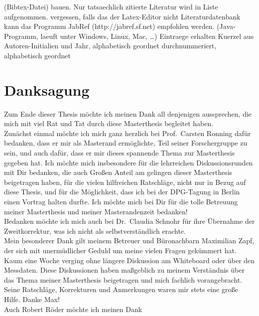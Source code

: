 (Bibtex-Datei) bauen. Nur tatsaechlich zitierte Literatur wird in Liste
aufgenommen. %
vergessen, falls das der Latex-Editor nicht %
Literaturdatenbank kann das Programm JabRef (http://jabref.sf.net) empfohlen
werden. (Java-Programm, laeuft unter Windows, Linux, Mac, \ldots)
Eintraege erhalten Kuerzel aus Autoren-Initialien und Jahr, alphabetisch
geordnet %
durchnummeriert, alphabetisch geordnet  \newpage
\thispagestyle{empty} \section*{Danksagung} Zum Ende dieser Thesis möchte ich
meinen Dank all denjenigen aussprechen, die mich mit viel Rat und Tat durch
diese Masterthesis begleitet haben.\\ Zunächst einmal möchte ich mich ganz
herzlich bei Prof.\ Carsten Ronning dafür bedanken, dass er mir als Masterand
ermöglichte, Teil seiner Forschergruppe zu sein, und auch dafür, dass er mir
dieses spannende Thema zur Masterthesis gegeben hat. Ich möchte mich
insbesondere für die lehrreichen Diskussionsrunden mit Dir bedanken, die auch
Großen Anteil am gelingen dieser Masterthesis beigetragen haben, für die vielen
hilfreichen Ratschläge, nicht nur in Bezug auf diese Thesis, und für die
Möglichkeit, dass ich bei der DPG-Tagung in Berlin einen Vortrag halten durfte.
Ich möchte mich bei Dir für die tolle Betreuung meiner Masterthesis und meiner
Masterandenzeit bedanken!\\ Bedanken möchte ich mich auch bei Dr.\ Claudia
Schnohr für ihre Übernahme der Zweitkorrektur, was ich nicht als
selbstverständlich erachte.\\ Mein besonderer Dank gilt meinem Betreuer und
Büronachbarn Maximilian Zapf, der sich mit unermüdlicher Geduld um meine vielen
Fragen gekümmert hat. Kaum eine Woche verging ohne längere Diskussion am
Whiteboard oder über den Messdaten. Diese Diskussionen haben maßgeblich zu
meinem Verständnis über das Thema meiner Masterthesis beigetragen und mich
fachlich vorangebracht. Seine Ratschläge, Korrekturen und Anmerkungen waren mir
stets eine große Hilfe. Danke Max!\\ Auch Robert Röder möchte ich meinen Dank

